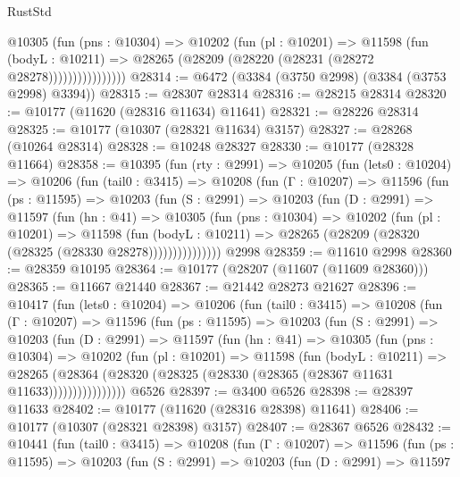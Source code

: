 \begin{lexlean}{RustStd}
\begin{coremodule}
                    @10305
                      (fun (pns : @10304) =>
                      @10202
                        (fun (pl : @10201) =>
                        @11598
                          (fun (bodyL : @10211) =>
                          @28265 (@28209 (@28220 (@28231 (@28272 @28278))))))))))))))))
@28314 := @6472 (@3384 (@3750 @2998) (@3384 (@3753 @2998) @3394))
@28315 := @28307 @28314
@28316 := @28215 @28314
@28320 := @10177 (@11620 (@28316 @11634) @11641)
@28321 := @28226 @28314
@28325 := @10177 (@10307 (@28321 @11634) @3157)
@28327 := @28268 (@10264 @28314)
@28328 := @10248 @28327
@28330 := @10177 (@28328 @11664)
@28358 := @10395
    (fun (rty : @2991) =>
    @10205
      (fun (lets0 : @10204) =>
      @10206
        (fun (tail0 : @3415) =>
        @10208
          (fun (Γ : @10207) =>
          @11596
            (fun (ps : @11595) =>
            @10203
              (fun (S : @2991) =>
              @10203
                (fun (D : @2991) =>
                @11597
                  (fun (hn : @41) =>
                  @10305
                    (fun (pns : @10304) =>
                    @10202
                      (fun (pl : @10201) =>
                      @11598
                        (fun (bodyL : @10211) =>
                        @28265 (@28209 (@28320 (@28325 (@28330 @28278)))))))))))))))
    @2998
@28359 := @11610 @2998
@28360 := @28359 @10195
@28364 := @10177 (@28207 (@11607 (@11609 @28360)))
@28365 := @11667 @21440
@28367 := @21442 @28273 @21627
@28396 := @10417
    (fun (lets0 : @10204) =>
    @10206
      (fun (tail0 : @3415) =>
      @10208
        (fun (Γ : @10207) =>
        @11596
          (fun (ps : @11595) =>
          @10203
            (fun (S : @2991) =>
            @10203
              (fun (D : @2991) =>
              @11597
                (fun (hn : @41) =>
                @10305
                  (fun (pns : @10304) =>
                  @10202
                    (fun (pl : @10201) =>
                    @11598
                      (fun (bodyL : @10211) =>
                      @28265
                        (@28364
                          (@28320 (@28325 (@28330 (@28365 (@28367 @11631 @11633))))))))))))))))
    @6526
@28397 := @3400 @6526
@28398 := @28397 @11633
@28402 := @10177 (@11620 (@28316 @28398) @11641)
@28406 := @10177 (@10307 (@28321 @28398) @3157)
@28407 := @28367 @6526
@28432 := @10441
    (fun (tail0 : @3415) =>
    @10208
      (fun (Γ : @10207) =>
      @11596
        (fun (ps : @11595) =>
        @10203
          (fun (S : @2991) =>
          @10203
            (fun (D : @2991) =>
            @11597

\end{coremodule}
\end{lexlean}
